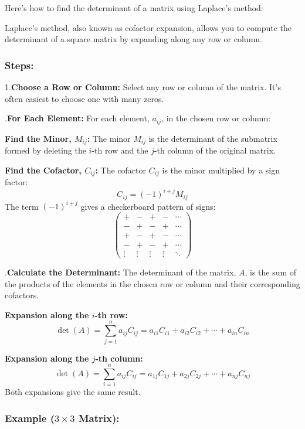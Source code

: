 Here's how to find the determinant of a matrix using Laplace's method:

Laplace's method, also known as cofactor expansion, allows you to compute the determinant of a square matrix by expanding along any row or column.

\subsubsection*{Steps:}

1.\textbf{Choose a Row or Column:} Select any row or column of the matrix.  It's often easiest to choose one with many zeros.

.\textbf{For Each Element:} For each element, \(a_{ij}\), in the chosen row or column:

    \textbf{Find the Minor, \(M_{ij}\):} The minor \(M_{ij}\) is the determinant of the submatrix formed by deleting the 
    \indent \(i\)-th row and the \(j\)-th column of the original matrix.

    \textbf{Find the Cofactor, \(C_{ij}\):} The cofactor \(C_{ij}\) is the minor multiplied by a sign factor:
        \[
        C_{ij} = (-1)^{i+j} M_{ij}
        \]
        The term  \((-1)^{i+j}\)  gives a checkerboard pattern of signs:
        \[
        \begin{pmatrix}
        + & - & + & - & \cdots \\
        - & + & - & + & \cdots \\
        + & - & + & - & \cdots \\
        - & + & - & + & \cdots \\
        \vdots & \vdots & \vdots & \vdots & \ddots
        \end{pmatrix}
        \]

.\textbf{Calculate the Determinant:} The determinant of the matrix, \(A\), is the sum of the products of the elements in the chosen row or column and their corresponding cofactors.

    \textbf{Expansion along the \(i\)-th row:}
        \[
        \det(A) = \sum_{j=1}^{n} a_{ij} C_{ij} = a_{i1}C_{i1} + a_{i2}C_{i2} + \cdots + a_{in}C_{in}
        \]

    \textbf{Expansion along the \(j\)-th column:}
        \[
        \det(A) = \sum_{i=1}^{n} a_{ij} C_{ij} = a_{1j}C_{1j} + a_{2j}C_{2j} + \cdots + a_{nj}C_{nj}
        \]
        Both expansions give the same result.

\subsubsection*{Example ($3\times3$ Matrix):}

